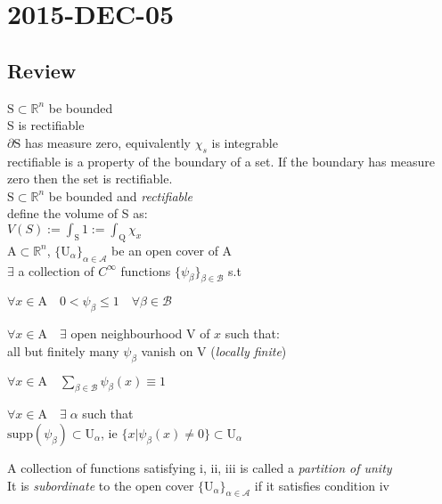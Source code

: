 
\section{2015-DEC-05}
\subsection{Review}
\LET $\mathrm{S}\subset\mathbb{R}^n$ be bounded  \\
\THEN S is rectifiable \\ 
\IFF $\partial \mathrm{S}$ has measure zero, equivalently $\chi_s$ is integrable\\
\IDEA rectifiable is a property of the boundary of a set. If the boundary has measure zero then the set is rectifiable.\\

\LET $\mathrm{S}\subset\mathbb{R}^n$ be bounded and \textit{rectifiable}\\ 
\THEN define the volume of S as:\\
$V(S):=\int_{\mathrm{S}}1:=\int_{\mathrm{Q}}\chi_x$\\

\LET $\mathrm{A}\subset\mathbb{R}^n$, 
$\{\mathrm{U}_\alpha\}_{\alpha\in\mathcal{A}}$ be an open cover of A\\
\THEN $\exists$ a collection of $C^\infty$ functions $\{\psi_\beta\}_{\beta\in\mathcal{B}}$ s.t
\begin{myenumerate}
\item $\forall x\in\mathrm{A}\quad 0<\psi_\beta\leq1\quad\forall\beta\in\mathcal{B}$ 
\item $\forall x\in\mathrm{A}\quad\exists$ open neighbourhood V of $x$ such that:\\
  all but finitely many $\psi_\beta$ vanish on V (\textit{locally finite})
\item $\forall x\in\mathrm{A}\quad\sum_{\beta\in\mathcal{B}}\psi_\beta(x)\equiv 1$
\item $\forall x\in\mathrm{A}\quad\exists\;\alpha$ such that\\
  $\mathrm{supp}(\psi_\beta)\subset\mathrm{U}_\alpha$, ie
  $\{x|\psi_\beta(x)\neq0\}\subset\mathrm{U}_\alpha$
\end{myenumerate}
A collection of functions satisfying i, ii, iii is called a \textit{partition of unity}\\
It is \textit{subordinate} to the open cover $\{\mathrm{U}_\alpha\}_{\alpha\in\mathcal{A}}$ 
if it satisfies condition iv


